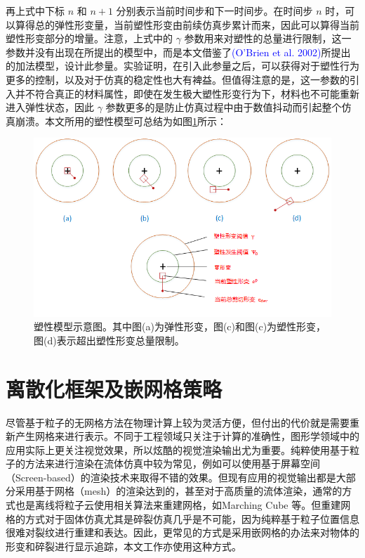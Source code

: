 再上式中下标 $n$ 和 $n + 1$ 分别表示当前时间步和下一时间步。在时间步 $n$ 时，可以算得总的弹性形变量，当前塑性形变由前续仿真步累计而来，因此可以算得当前塑性形变部分的增量。注意，上式中的 $\gamma$ 参数用来对塑性的总量进行限制，这一参数并没有出现在所提出的模型中，而是本文借鉴了\textcolor{blue}{(O'Brien et al. 2002)\parencite{OBrien2002}}所提出的加法模型，设计此参量。实验证明，在引入此参量之后，可以获得对于塑性行为更多的控制，以及对于仿真的稳定性也大有裨益。但值得注意的是，这一参数的引入并不符合真正的材料属性，即使在发生极大塑性形变行为下，材料也不可能重新进入弹性状态，因此 $\gamma$ 参数更多的是防止仿真过程中由于数值抖动而引起整个仿真崩溃。本文所用的塑性模型可总结为如图\ref{plasticity_model}所示：

\begin{figure}[!htb]
  \centering
  \captionsetup{justification=centering}
  \includegraphics[width=\linewidth]{chap/image/plasticity_model}

  \caption{\label{plasticity_model}
           塑性模型示意图。其中图(a)为弹性形变，图(c)和图(c)为塑性形变，图(d)表示超出塑性形变总量限制。
          }
\end{figure}


\section{离散化框架及嵌网格策略}
\label{discretization}

尽管基于粒子的无网格方法在物理计算上较为灵活方便，但付出的代价就是需要重新产生网格来进行表示。不同于工程领域只关注于计算的准确性，图形学领域中的应用实际上更关注视觉效果，所以炫酷的视觉渲染输出尤为重要。纯粹使用基于粒子的方法来进行渲染在流体仿真中较为常见，例如可以使用基于屏幕空间（Screen-based）的渲染技术来取得不错的效果。但现有应用的视觉输出都是大部分采用基于网格（mesh）的渲染达到的，甚至对于高质量的流体渲染，通常的方式也是离线将粒子云使用相关算法来重建网格，如Marching Cube 等。但重建网格的方式对于固体仿真尤其是碎裂仿真几乎是不可能，因为纯粹基于粒子位置信息很难对裂纹进行重建和表达。因此，更常见的方式是采用嵌网格的办法来对物体的形变和碎裂进行显示追踪，本文工作亦使用这种方式。

